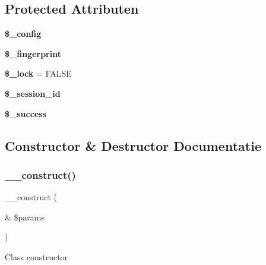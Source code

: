 \subsection*{Protected Attributen}
\begin{DoxyCompactItemize}
\item 
\mbox{\label{class_c_i___session__driver_a4d4ad4af1600438042f93a4492f8dbbe}} 
{\bfseries \$\+\_\+config}
\item 
\mbox{\label{class_c_i___session__driver_ac926edb2847b6610e253be83270c2cc2}} 
{\bfseries \$\+\_\+fingerprint}
\item 
\mbox{\label{class_c_i___session__driver_a1cfb8ce1d225fe600a6a034d685b8ff6}} 
{\bfseries \$\+\_\+lock} = F\+A\+L\+SE
\item 
\mbox{\label{class_c_i___session__driver_a92023c94926d17b1f6705c8b1d35a103}} 
{\bfseries \$\+\_\+session\+\_\+id}
\item 
\mbox{\label{class_c_i___session__driver_a0f7033d534d3f4ae0f5467368f724e7b}} 
{\bfseries \$\+\_\+success}
\end{DoxyCompactItemize}


\subsection{Constructor \& Destructor Documentatie}
\mbox{\label{class_c_i___session__driver_ac1669c73d53d6f16cf5459a1e84d39c8}} 
\subsubsection{\texorpdfstring{\_\_construct()}{\_\_construct()}}
{\footnotesize\ttfamily \+\_\+\+\_\+construct (\begin{DoxyParamCaption}\item[{\&}]{\$params }\end{DoxyParamCaption})}

Class constructor


